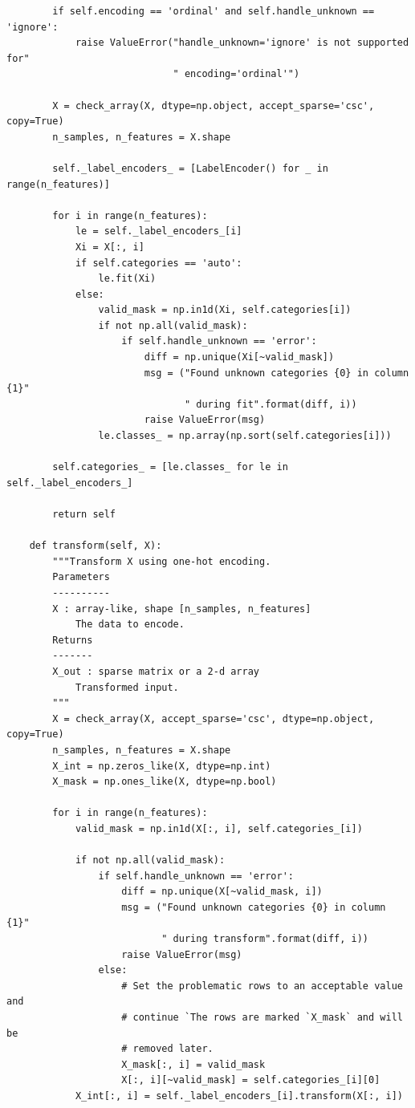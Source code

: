 \documentclass[UTF8]{ctexart}
\begin{document}
\begin{lstlisting}
        if self.encoding == 'ordinal' and self.handle_unknown == 'ignore':
            raise ValueError("handle_unknown='ignore' is not supported for"
                             " encoding='ordinal'")

        X = check_array(X, dtype=np.object, accept_sparse='csc', copy=True)
        n_samples, n_features = X.shape

        self._label_encoders_ = [LabelEncoder() for _ in range(n_features)]

        for i in range(n_features):
            le = self._label_encoders_[i]
            Xi = X[:, i]
            if self.categories == 'auto':
                le.fit(Xi)
            else:
                valid_mask = np.in1d(Xi, self.categories[i])
                if not np.all(valid_mask):
                    if self.handle_unknown == 'error':
                        diff = np.unique(Xi[~valid_mask])
                        msg = ("Found unknown categories {0} in column {1}"
                               " during fit".format(diff, i))
                        raise ValueError(msg)
                le.classes_ = np.array(np.sort(self.categories[i]))

        self.categories_ = [le.classes_ for le in self._label_encoders_]

        return self

    def transform(self, X):
        """Transform X using one-hot encoding.
        Parameters
        ----------
        X : array-like, shape [n_samples, n_features]
            The data to encode.
        Returns
        -------
        X_out : sparse matrix or a 2-d array
            Transformed input.
        """
        X = check_array(X, accept_sparse='csc', dtype=np.object, copy=True)
        n_samples, n_features = X.shape
        X_int = np.zeros_like(X, dtype=np.int)
        X_mask = np.ones_like(X, dtype=np.bool)

        for i in range(n_features):
            valid_mask = np.in1d(X[:, i], self.categories_[i])

            if not np.all(valid_mask):
                if self.handle_unknown == 'error':
                    diff = np.unique(X[~valid_mask, i])
                    msg = ("Found unknown categories {0} in column {1}"
                           " during transform".format(diff, i))
                    raise ValueError(msg)
                else:
                    # Set the problematic rows to an acceptable value and
                    # continue `The rows are marked `X_mask` and will be
                    # removed later.
                    X_mask[:, i] = valid_mask
                    X[:, i][~valid_mask] = self.categories_[i][0]
            X_int[:, i] = self._label_encoders_[i].transform(X[:, i])


\end{lstlisting}
\end{document}
